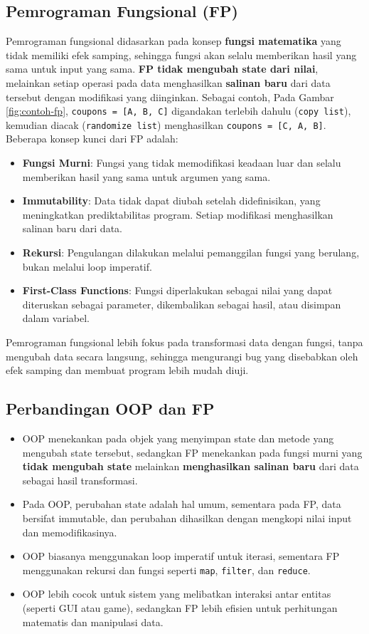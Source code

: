 \subsection{Pemrograman Fungsional (FP)}
Pemrograman fungsional didasarkan pada konsep \textbf{fungsi matematika} yang tidak memiliki efek samping, sehingga fungsi akan selalu memberikan hasil yang sama untuk input yang sama. \textbf{FP tidak mengubah state dari nilai}, melainkan setiap operasi pada data menghasilkan \textbf{salinan baru} dari data tersebut dengan modifikasi yang diinginkan. Sebagai contoh, Pada Gambar \ref{fig:contoh-fp}, \texttt{coupons = [A, B, C]} digandakan terlebih dahulu (\texttt{copy list}), kemudian diacak (\texttt{randomize list}) menghasilkan \texttt{coupons = [C, A, B]}. Beberapa konsep kunci dari FP adalah:
\begin{itemize}
	\item \textbf{Fungsi Murni}: Fungsi yang tidak memodifikasi keadaan luar dan selalu memberikan hasil yang sama untuk argumen yang sama.
	\item \textbf{Immutability}: Data tidak dapat diubah setelah didefinisikan, yang meningkatkan prediktabilitas program. Setiap modifikasi menghasilkan salinan baru dari data.
	\item \textbf{Rekursi}: Pengulangan dilakukan melalui pemanggilan fungsi yang berulang, bukan melalui loop imperatif.
	\item \textbf{First-Class Functions}: Fungsi diperlakukan sebagai nilai yang dapat diteruskan sebagai parameter, dikembalikan sebagai hasil, atau disimpan dalam variabel.
\end{itemize}
Pemrograman fungsional lebih fokus pada transformasi data dengan fungsi, tanpa mengubah data secara langsung, sehingga mengurangi bug yang disebabkan oleh efek samping dan membuat program lebih mudah diuji.

\subsection{Perbandingan OOP dan FP}
\begin{itemize}
	\item OOP menekankan pada objek yang menyimpan state dan metode yang mengubah state tersebut, sedangkan FP menekankan pada fungsi murni yang \textbf{tidak mengubah state} melainkan \textbf{menghasilkan salinan baru} dari data sebagai hasil transformasi.
	\item Pada OOP, perubahan state adalah hal umum, sementara pada FP, data bersifat immutable, dan perubahan dihasilkan dengan mengkopi nilai input dan memodifikasinya.
	\item OOP biasanya menggunakan loop imperatif untuk iterasi, sementara FP menggunakan rekursi dan fungsi seperti \texttt{map}, \texttt{filter}, dan \texttt{reduce}.
	\item OOP lebih cocok untuk sistem yang melibatkan interaksi antar entitas (seperti GUI atau game), sedangkan FP lebih efisien untuk perhitungan matematis dan manipulasi data.
\end{itemize}

